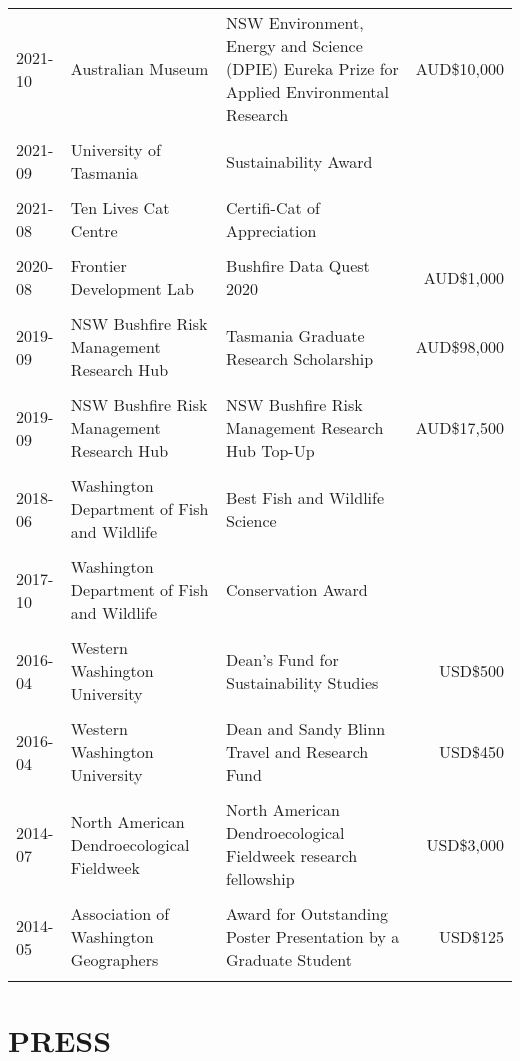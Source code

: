 \documentclass[11pt,a4paper,]{awesome-cv}
\begin{document}
\begingroup\fontsize{10}{16}
\begin{tabular}{lp{5.5cm}p{7.75cm}r}
   \hline
2021-10 & Australian Museum & NSW Environment, Energy and Science (DPIE) Eureka Prize for Applied Environmental Research & AUD\$10,000 \\ 
   \\[-0.2cm]2021-09 & University of Tasmania & Sustainability Award &  \\ 
   \\[-0.2cm]2021-08 & Ten Lives Cat Centre & Certifi-Cat of Appreciation &  \\ 
   \\[-0.2cm]2020-08 & Frontier Development Lab & Bushfire Data Quest 2020 & AUD\$1,000 \\ 
   \\[-0.2cm]2019-09 & NSW Bushfire Risk Management Research Hub & Tasmania Graduate Research Scholarship & AUD\$98,000 \\ 
   \\[-0.2cm]2019-09 & NSW Bushfire Risk Management Research Hub & NSW Bushfire Risk Management Research Hub Top-Up & AUD\$17,500 \\ 
   \\[-0.2cm]2018-06 & Washington Department of Fish and Wildlife & Best Fish and Wildlife Science &  \\ 
   \\[-0.2cm]2017-10 & Washington Department of Fish and Wildlife & Conservation Award &  \\ 
   \\[-0.2cm]2016-04 & Western Washington University & Dean's Fund for Sustainability Studies & USD\$500 \\ 
   \\[-0.2cm]2016-04 & Western Washington University & Dean and Sandy Blinn Travel and Research Fund & USD\$450 \\ 
   \\[-0.2cm]2014-07 & North American Dendroecological Fieldweek & North American Dendroecological Fieldweek research fellowship & USD\$3,000 \\ 
   \\[-0.2cm]2014-05 & Association of Washington Geographers & Award for Outstanding Poster Presentation by a Graduate Student & USD\$125 \\ 
   \\[-0.2cm] \hline
\end{tabular}
\endgroup

\hypertarget{press}{%
\section{PRESS}\label{press}}
\end{document}
